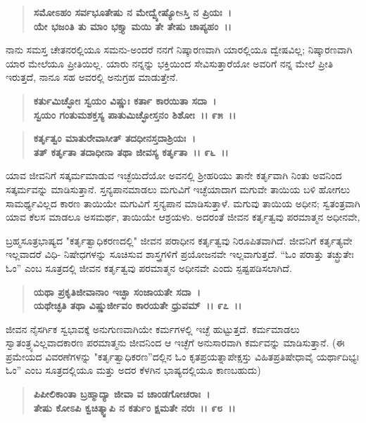 \begin{verse}
\textbf{ಸಮೋಽಹಂ ಸರ್ವಭೂತೇಷು ನ ಮೇದ್ವ್ಯೇಷ್ಯೋsಸ್ತಿ ನ ಪ್ರಿಯಃ~।}\\\textbf{ಯೇ ಭಜಂತಿ ತು ಮಾಂ ಭಕ್ತ್ಯಾ ಮಯಿ ತೇ ತೇಷು ಚಾಪ್ಯಹಂ~।।} 
\end{verse}

ನಾನು ಸಮಸ್ತ ಚೇತನರಲ್ಲಿಯೂ ಸಮನು-ಅಂದರೆ ನನಗೆ ನಿಷ್ಕಾರಣವಾಗಿ ಯಾರಲ್ಲಿಯೂ ದ್ವೇಷವಿಲ್ಲ; ನಿಷ್ಕಾರಣವಾಗಿ ಯಾರ ಮೇಲೆಯೂ ಪ್ರೀತಿಯಿಲ್ಲ. ಯಾರು ನನ್ನನ್ನು ಭಕ್ತಿಯಿಂದ ಸೇವಿಸುತ್ತಾರೆಯೋ ಅವರಿಗೆ ನನ್ನ ಮೇಲೆ ಪ್ರೀತಿ ಇರುತ್ತದೆ, ನಾನೂ ಸಹ ಅವರಲ್ಲಿ ಅನುಗ್ರಹ ಮಾಡುತ್ತೇನೆ.

\begin{verse}
\textbf{ಕರ್ತುಮಿಚ್ಛೋಃ ಸ್ವಯಂ ವಿಷ್ಣುಃ ಕರ್ತಾ ಕಾರಯಿತಾ ಸದಾ~।}\\\textbf{ಸ್ವಯಂ ಗಂತುಮಶಕ್ತಸ್ಯ ಪಾತುಮಿಚ್ಛೋಸ್ತನಂ ಶಿಶೋಃ~।। ೯೫~।।} 
\end{verse}

\begin{verse}
\textbf{ಕರ್ತೃತ್ವಂ ಮಾತುರೇವಾಸೀತ್ ತದಧೀನಸ್ತದಾಶ್ರಿಯಃ~।}\\\textbf{ತತ್ ಕರ್ತೃತಾ ತದಾಧೀನಾ ತಥಾ ಜೀವಸ್ಯ ಕರ್ತೃತಾ~।। ೯೬~।।}
\end{verse}

ಯಾವ ಜೀವನಿಗೆ ಸತ್ಕರ್ಮಮಾಡುವ ಇಚ್ಛೆಯಿದೆಯೋ ಅವನಲ್ಲಿ ಶ‍್ರೀಹರಿಯು ತಾನೇ ಕರ್ತೃವಾಗಿ ನಿಂತು ಅವನಿಂದ ಸತ್ಕರ್ಮವನ್ನು ಮಾಡಿಸುತ್ತಾನೆ. ಸ್ತನ್ಯಪಾನಮಾಡಲು ಮಗುವಿಗೆ ಇಚ್ಛೆಯಾದಾಗ ಮಗುವೇ ತಾಯಿಯ ಬಳಿ ಹೋಗಲು ಸಾಮರ್ಥ್ಯವಿಲ್ಲದ ಕಾರಣ ತಾಯಿಯೇ ಮಗುವಿಗೆ ಸ್ತನ್ಯಪಾನ ಮಾಡಿಸುತ್ತಾಳೆ. ಮಗುವು ತಾಯಿಯ ಅಧೀನ; ಸ್ವತಂತ್ರವಾಗಿ ಯಾವ ಕೆಲಸ ಮಾಡಲೂ ಅಸಮರ್ಥ, ತಾಯಿಯೇ ಆಶ್ರಯಳು. ಅದರಂತೆ ಜೀವನ ಕರ್ತೃತ್ವವು ಪರಮಾತ್ಮನ ಅಧೀನವೇ,

ಬ್ರಹ್ಮಸೂತ್ರಭಾಷ್ಯದ "ಕರ್ತೃತ್ವಾಧಿಕರಣದಲ್ಲಿ" ಜೀವನ ಪರಾಧೀನ ಕರ್ತೃತ್ವವು ನಿರೂಪಿತವಾಗಿದೆ. ಜೀವನಿಗೆ ಕರ್ತೃತ್ಯವೇ ಇಲ್ಲವಾದರೆ ವಿಧಿ- ನಿಷೇಧಗಳನ್ನು ಸೂಚಿಸುವ ಶಾಸ್ತ್ರಗಳಿಗೆ ಪ್ರಯೋಜನವೇ ಇಲ್ಲವಾಗುತ್ತದೆ. “ಓಂ ಪರಾತ್ತು ತಚ್ಛ್ರುತೇಃ ಓಂ” ಎಂಬ ಸೂತ್ರದಲ್ಲಿ ಜೀವನ ಕರ್ತೃತ್ವವು ಪರಮಾತ್ಮನ ಅಧೀನವೇ ಎಂದು ಸ್ಪಷ್ಟಪಡಿಸಲಾಗಿದೆ.

\begin{verse}
\textbf{ಯಥಾ ಪ್ರಕೃತಿಜೀವಾನಾಂ ಇಚ್ಛಾ ಸಂಜಾಯತೇ ಸದಾ~।}\\\textbf{ಯಥೇಚ್ಛತಿ ತಥಾ ವಿಷ್ಣುರ್ಜೀವಂ ಕಾರಯತೇ ಧ್ರುವಮ್~।। ೯೭~।।}
\end{verse}

ಜೀವನ ನೈಸರ್ಗಿಕ ಸ್ವಭಾವಕ್ಕೆ ಅನುಗುಣವಾಗಿಯೇ ಕರ್ಮಗಳಲ್ಲಿ ಇಚ್ಛೆ ಹುಟ್ಟುತ್ತದೆ. ಕರ್ಮಮಾಡಲು ಸ್ವಾತಂತ್ರ್ಯವಿಲ್ಲವಾದಕಾರಣ ಪರಮಾತ್ಮನು ಜೀವನಿಂದ ಆ ಇಚ್ಛೆಗೆ ಅನುಸಾರವಾಗಿ ಕರ್ಮವನ್ನು ಮಾಡಿಸುತ್ತಾನೆ. (ಈ ಪ್ರಮೇಯದ ವಿವರಣೆಗಳನ್ನು "ಕರ್ತೃತ್ವಾಧಿಕರಣ”ದಲ್ಲಿನ ಓಂ ಕೃತಪ್ರಯತ್ನಾಪೇಕ್ಷಸ್ತು ವಿಹಿತಪ್ರತಿಷೇಧಾವೈ ಯರ್ಥಾದಿಭ್ಯಃ ಓಂ” ಎಂಬ ಸೂತ್ರದಲ್ಲಿಯೂ ಮತ್ತು ಅದರ ಕೆಳಗಿನ ಭಾಷ್ಯದಲ್ಲಿಯೂ ಕಾಣಬಹುದು)

\begin{verse}
\textbf{ಪಿಪೀಲಿಕಾಂತಾ ಬ್ರಹ್ಮಾದ್ಯಾ ಜೀವಾ ವ ಚಾಂಡಗೋಚರಾಃ~।}\\\textbf{ತೇಷು ಕೋಽಪಿ ಕ್ವಚಿತ್ಕ್ವಾಪಿ ನ ಕರ್ತುಂ ಕ್ಷಮತೇ ನರಃ~।। ೯೮~।।}
\end{verse}

